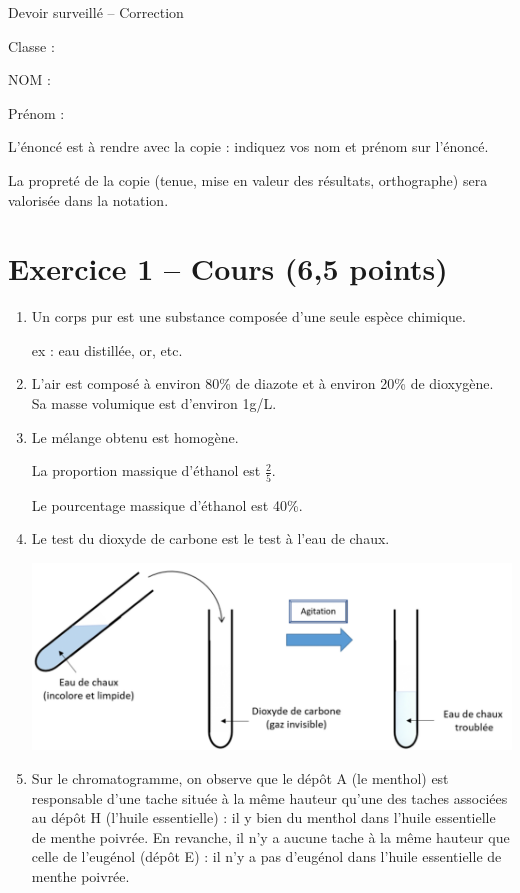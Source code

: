 
\usepackage{setspace}



\begin{header}
Devoir surveillé -- Correction
\normalsize
\flushleft
\begin{doublespace}
Classe :

NOM :

\end{doublespace}
Prénom :
\end{header}
L'énoncé est à rendre avec la copie : indiquez vos nom et prénom sur l'énoncé.

\noindent
La propreté de la copie (tenue, mise en valeur des résultats, orthographe) sera valorisée dans la notation.

\section*{Exercice 1 -- Cours (6,5 points)}

\begin{enumerate}
\item Un corps pur est une substance composée d'une seule espèce chimique.

ex : eau distillée, or, etc.

\item L'air est composé à environ \unit{80}{\%} de diazote et à environ \unit{20}{\%} de dioxygène.
Sa masse volumique est d'environ \unit{1}{g/L}.

\item Le mélange obtenu est homogène.

La proportion massique d'éthanol est $\frac{2}{5}$.

Le pourcentage massique d'éthanol est \unit{40}{\%}.

\item Le test du dioxyde de carbone est le test à l'eau de chaux.

\begin{center}
\includegraphics[scale=0.5]{../images/test_co2_legende.png}
\end{center}

\item Sur le chromatogramme, on observe que le dépôt A (le menthol) est responsable d'une tache située à la même hauteur qu'une des taches associées au dépôt H (l'huile essentielle) : il y bien du menthol dans l'huile essentielle de menthe poivrée.
En revanche, il n'y a aucune tache à la même hauteur que celle de l'eugénol (dépôt E) : il n'y a pas d'eugénol dans l'huile essentielle de menthe poivrée.

\end{enumerate}

